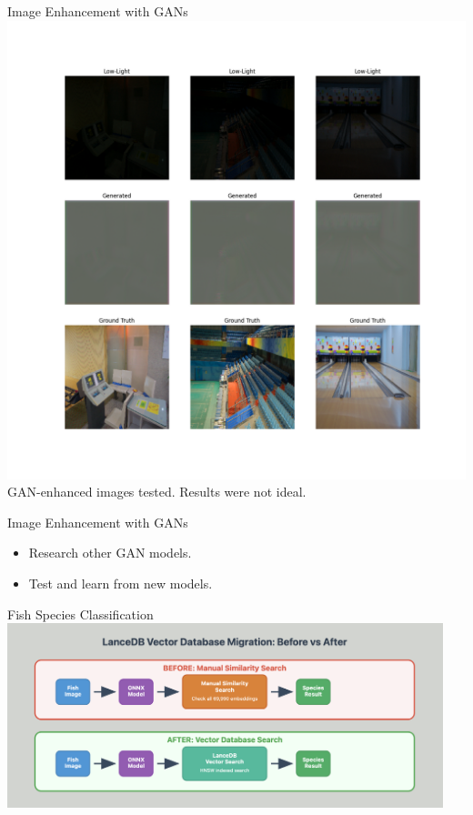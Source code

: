 \begin{frame}{Image Enhancement with GANs}
    \centering
    \includegraphics[width=1.0\textwidth, height=0.8\textheight, keepaspectratio]{images/plot_000001.png}
    \vspace{0.5em}
    GAN-enhanced images tested.
    Results were not ideal.
\end{frame}

\begin{frame}{Image Enhancement with GANs}
    \begin{itemize}
        \item Research other GAN models.
        \item Test and learn from new models.
    \end{itemize}
\end{frame}

\begin{frame}{Fish Species Classification}
    \centering
    \includegraphics[height=0.8\textheight,width=0.95\textwidth,keepaspectratio]{images/vectordb_migration.png}
\end{frame}

